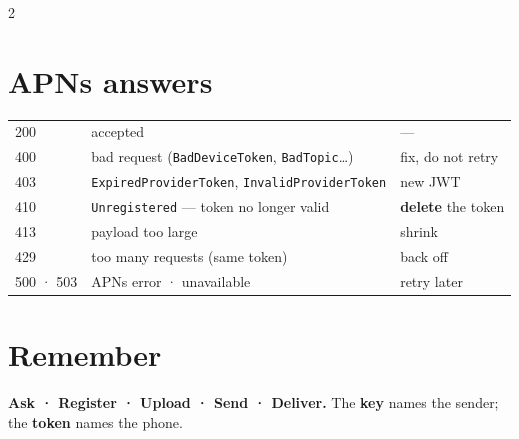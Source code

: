 \documentclass[8pt]{extarticle}
\begin{document}
\begin{multicols}{2}
\section{APNs answers}
{\footnotesize
\begin{tabular}{@{}l l l@{}}
\toprule
200 & accepted & — \\
400 & bad request (\texttt{BadDeviceToken}, \texttt{BadTopic}…) & fix, do not retry \\
403 & \texttt{ExpiredProviderToken}, \texttt{InvalidProviderToken} & new JWT \\
410 & \texttt{Unregistered} — token no longer valid & \textbf{delete} the token \\
413 & payload too large & shrink \\
429 & too many requests (same token) & back off \\
500 · 503 & APNs error · unavailable & retry later \\
\bottomrule
\end{tabular}}

\section{Remember}
\textbf{Ask · Register · Upload · Send · Deliver.} The \textbf{key} names the
sender; the \textbf{token} names the phone.


\end{multicols}

\end{document}
